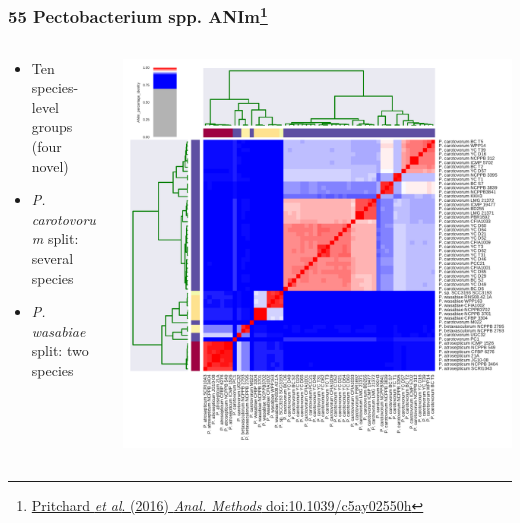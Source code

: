 \begin{frame}
  \frametitle{55 Pectobacterium spp. ANIm\footnote{\tiny{\href{http://dx.doi.org/10.1039/c5ay02550h}{Pritchard \textit{et al}. (2016) \textit{Anal. Methods} doi:10.1039/c5ay02550h}}}}
  \begin{columns}[T]
    \begin{column}{3cm}
      \begin{itemize}
        \item Ten species-level groups (four novel)
        \item \small{\textit{P. carotovorum} split: several species}
        \item \small{\textit{P. wasabiae} split: two species}
      \end{itemize}
    \end{column}
    \begin{column}{7cm}
      \includegraphics[width=1\textwidth]{images/Pectobacterium_ANIm_percentage_identity}
    \end{column}
  \end{columns}
\end{frame}

